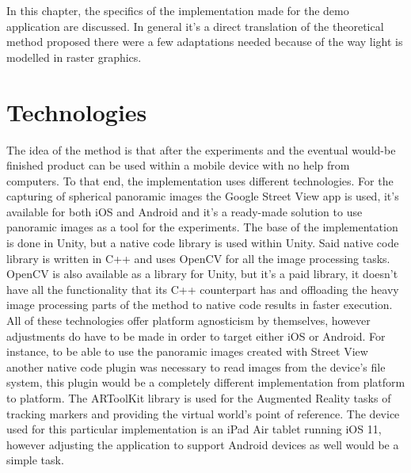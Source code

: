 
In this chapter, the specifics of the implementation made for the demo application are discussed. In general it's a direct translation of the theoretical method proposed there were a few adaptations needed because of the way light is modelled in raster graphics.

\section{Technologies}
The idea of the method is that after the experiments and the eventual would-be finished product can be used within a mobile device with no help from computers. To that end, the implementation uses different technologies. For the capturing of spherical panoramic images the Google Street View app is used, it's available for both iOS and Android and it's a ready-made solution to use panoramic images as a tool for the experiments. The base of the implementation is done in Unity, but a native code library is used within Unity. Said native code library is written in C++ and uses OpenCV for all the image processing tasks. OpenCV is also available as a library for Unity, but it's a paid library, it doesn't have all the functionality that its C++ counterpart has and offloading the heavy image processing parts of the method to native code results in faster execution.\newline
All of these technologies offer platform agnosticism by themselves, however adjustments do have to be made in order to target either iOS or Android. For instance, to be able to use the panoramic images created with Street View another native code plugin was necessary to read images from the device's file system, this plugin would be a completely different implementation from platform to platform. The ARToolKit library is used for the Augmented Reality tasks of tracking markers and providing the virtual world's point of reference. The device used for this particular implementation is an iPad Air tablet running iOS 11, however adjusting the application to support Android devices as well would be a simple task.\newline

